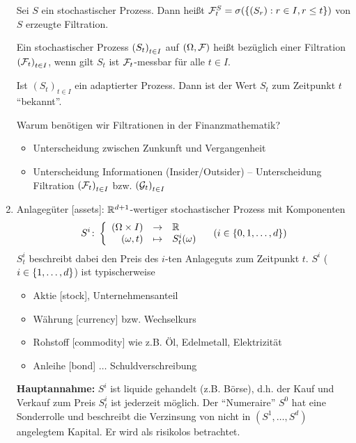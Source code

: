 \begin{enumerate}[leftmargin=*]
	\begin{beispiel}
		Sei $S$ ein stochastischer Prozess. Dann heißt
		$\mathcal{F}_t^S = \sigma( \left\{ (S_r) : r \in I, r \le t \right\} )$ von $S$ erzeugte Filtration.
	\end{beispiel}
	
	\begin{definition}
		Ein stochastischer Prozess $\left( S_t \right)_{t \in I}$ auf $(\Omega, \mathcal{F})$ heißt  bezüglich einer Filtration $\left( \mathcal{F}_t \right)_{t \in I}$, wenn gilt $S_t$ ist $\mathcal{F}_t$-messbar für alle $t \in I$.
	\end{definition}
	
	\begin{*interpretation}
		Ist $(S_t)_{t \in I}$ ein adaptierter Prozess. Dann ist der Wert $S_t$ zum Zeitpunkt $t$ \enquote{bekannt}.
	\end{*interpretation}

	\vspace{-\parskip}
	
	Warum benötigen wir Filtrationen in der Finanzmathematik?
	\begin{itemize}[nolistsep, topsep=-\parskip]
		\item Unterscheidung zwischen Zunkunft und Vergangenheit
		\item Unterscheidung Informationen (Insider/Outsider) -- Unterscheidung Filtration $\left( \mathcal{F}_t \right)_{t \in I}$ bzw. $\left( \mathcal{G}_t \right)_{t \in I}$
	\end{itemize}
	
	\item Anlagegüter [assets]: $\mathbb{R}^{d+1}$-wertiger stochastischer Prozess mit Komponenten
	\begin{equation*}
		S^i \colon \left\lbrace \begin{array}{rcl} (\Omega \times I) & \to & \mathbb{R} \\(\omega, t) & \mapsto & S_t^i(\omega) \end{array} \right. \quad (i \in \left\{ 0, 1, \dots , d \right\})
	\end{equation*}
	$S_t^i$ beschreibt dabei den Preis des $i$-ten Anlageguts zum Zeitpunkt $t$. $S^i$ ($i \in \left\{ 1, \dots , d \right\}$) ist typischerweise
	\begin{itemize}[nolistsep]
		\item Aktie [stock], Unternehmensanteil
		\item Währung [currency] bzw. Wechselkurs
		\item Rohstoff [commodity] wie z.B. Öl, Edelmetall, Elektrizität
		\item Anleihe [bond] $\dots$ Schuldverschreibung
	\end{itemize}
	
	\textbf{Hauptannahme:} $S^i$ ist liquide gehandelt (z.B. Börse), d.h. der Kauf und Verkauf zum Preis $S_t^i$ ist jederzeit möglich. 
	Der \enquote{Numeraire} $S^0$ hat eine Sonderrolle und beschreibt die Verzinsung von nicht in $(S^1, \dots , S^d)$ angelegtem Kapital. Er wird als risikolos betrachtet.
\end{enumerate}

